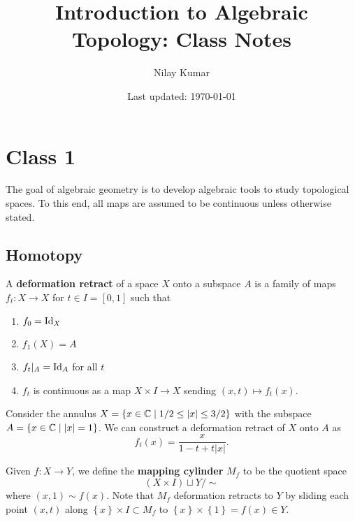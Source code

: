 \documentclass{../mathnotes}
\title{Introduction to Algebraic Topology: Class Notes}
\author{Nilay Kumar}
\date{Last updated: \today}
\begin{document}
\maketitle


\section{Class 1}
\begin{rem}
    The goal of algebraic geometry is to develop algebraic tools to study topological spaces. To this end, all maps are assumed
    to be continuous unless otherwise stated.
\end{rem}

\subsection{Homotopy}

\begin{defn}
    A \textbf{deformation retract} of a space $X$ onto a subspace $A$ is a family of maps
    $f_t:X\to X$ for $t\in I=[0,1]$ such that
    \begin{enumerate}
        \item $f_0=\operatorname{Id}_X$
        \item $f_1(X)=A$
        \item $f_t|_A=\operatorname{Id}_A$ for all $t$
        \item $f_t$ is continuous as a map $X\times I\to X$ sending $(x,t)\mapsto f_t(x)$.
    \end{enumerate}

\end{defn}

\begin{exmp}
    Consider the annulus $X=\left\{ x\in\mathbb{C} \mid 1/2\leq|x|\leq 3/2 \right\}$ with the subspace
    $A=\left\{ x\in\mathbb{C} \mid |x|=1 \right\}$. We can construct a deformation retract of $X$ onto $A$ as
    \[f_t(x)=\frac{x}{1-t+t|x|}.\]
\end{exmp}

\begin{defn}
    Given $f:X\to Y$, we define the \textbf{mapping cylinder} $M_f$ to be the quotient space
    \[(X\times I)\sqcup Y/\sim\]
    where $(x,1)\sim f(x)$. Note that $M_f$ deformation retracts to $Y$ by sliding each point $(x,t)$ along $\left\{ x \right\}\times I\subset M_f$
    to $\left\{ x \right\}\times \left\{ 1 \right\}=f(x)\in Y$.
\end{defn}
\end{document}
